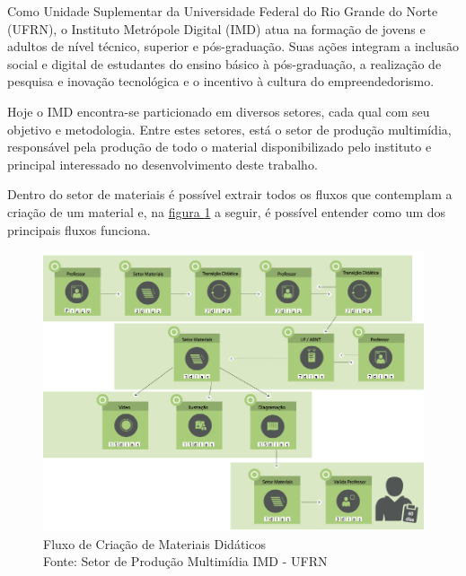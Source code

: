 Como Unidade Suplementar da Universidade Federal do Rio Grande do Norte (UFRN), o Instituto Metrópole Digital (IMD) atua na formação de jovens e adultos de nível técnico, superior e pós-graduação. Suas ações integram a inclusão social e digital de estudantes do ensino básico à pós-graduação, a realização de pesquisa e inovação tecnológica e o incentivo à cultura do empreendedorismo.

Hoje o IMD encontra-se particionado em diversos setores, cada qual com seu objetivo e metodologia. Entre estes setores, está o setor de produção multimídia, responsável pela produção de todo o material disponibilizado pelo instituto e principal interessado no desenvolvimento deste trabalho. 

Dentro do setor de materiais é possível extrair todos os fluxos que contemplam a criação de um material e, na \hyperref[fig:fluxo_materiais_novos]{figura \ref{fig:fluxo_materiais_novos}} a seguir, é possível entender como um dos principais fluxos funciona. \\

\begin{figure}[H]
\centering
     \includegraphics[width=1.0\textwidth]{Images/FluxoMateriaisNovos.jpg}
      \caption{Fluxo de Criação de Materiais Didáticos \\ Fonte: Setor de Produção Multimídia IMD - UFRN}
       \label{fig:fluxo_materiais_novos}
\end{figure}

